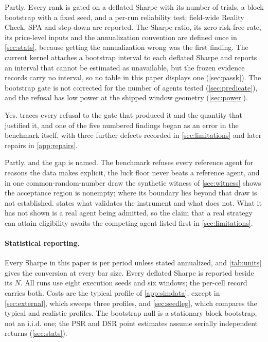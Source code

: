 \begin{description}[style=nextline,leftmargin=0pt,labelwidth=0pt,labelsep=0pt,itemindent=0pt,itemsep=3pt]
\item[Use statistical methods.] Partly. Every rank is gated on a deflated Sharpe with its number of trials, a block bootstrap with a fixed seed, and a per-run reliability test; field-wide Reality Check, SPA and step-down are reported. The Sharpe ratio, its zero risk-free rate, its price-level inputs and the annualization convention are defined once in \cref{sec:stats}, because getting the annualization wrong was the first finding. The current kernel attaches a bootstrap interval to each deflated Sharpe and reports an interval that cannot be estimated as unavailable, but the frozen evidence records carry no interval, so no table in this paper displays one (\cref{sec:passk}). The bootstrap gate is not corrected for the number of agents tested (\cref{sec:predicate}), and the refusal has low power at the shipped window geometry (\cref{sec:power}).
\item[Conduct error analysis.] Yes.  traces every refusal to the gate that produced it and the quantity that justified it, and one of the five numbered findings began as an error in the benchmark itself, with three further defects recorded in \cref{sec:limitations} and later repairs in \cref{app:repairs}.
\item[Justify construct validity.] Partly, and the gap is named. The benchmark refuses every reference agent for reasons the data makes explicit, the luck floor never beats a reference agent, and in one common-random-number draw the synthetic witness of \cref{sec:witness} shows the acceptance region is nonempty; where its boundary lies beyond that draw is not established.  states what validates the instrument and what does not. What it has not shown is a real agent being admitted, so the claim that a real strategy can attain eligibility awaits the competing agent listed first in \cref{sec:limitations}.
\end{description}

\paragraph{Statistical reporting.} Every Sharpe in this paper is per period unless stated annualized, and \cref{tab:units} gives the conversion at every bar size. Every deflated Sharpe is reported beside its $N$. All runs use eight execution seeds and six windows; the per-cell record carries both. Costs are the typical profile of \cref{app:simdata}, except in \cref{sec:external}, which sweeps three profiles, and \cref{sec:seedleg}, which compares the typical and realistic profiles. The bootstrap null is a stationary block bootstrap, not an i.i.d. one; the PSR and DSR point estimates assume serially independent returns (\cref{sec:stats}).

